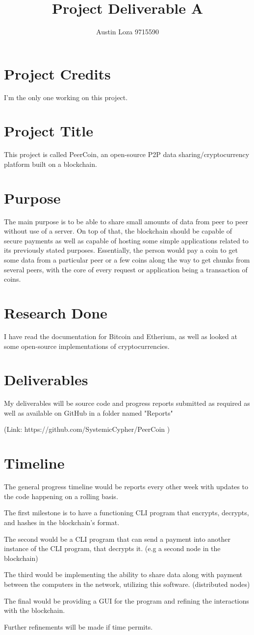 \documentclass [12pt] {article}
\begin{document}
\author{Austin Loza 9715590}
\title{Project Deliverable A}
\maketitle
\section*{Project Credits}
I'm the only one working on this project.
\section*{Project Title}
This project is called PeerCoin, an open-source P2P data sharing/cryptocurrency platform built on a blockchain. 
\section*{Purpose}
The main purpose is to be able to share small amounts of data from peer to peer without use of a server. On top of that, the blockchain should be capable of secure payments as well as capable of hosting some simple applications related to its previously stated purposes. Essentially, the person would pay a coin to get some data from a particular peer or a few coins along the way to get chunks from several peers, with the core of every request or application being a transaction of coins.
\section*{Research Done}
I have read the documentation for Bitcoin and Etherium, as well as looked at some open-source implementations of cryptocurrencies.
\section*{Deliverables}
My deliverables will be source code and progress reports submitted as required as well as available on GitHub in a folder named "Reports" 

(Link: https://github.com/SystemicCypher/PeerCoin )
\section*{Timeline}
The general progress timeline would be reports every other week with updates to the code happening on a rolling basis.

The first milestone is to have a functioning CLI program that encrypts, decrypts, and hashes in the blockchain's format.

The second would be a CLI program that can send a payment into another instance of the CLI program, that decrypts it. (e.g a second node in the blockchain)

The third would be implementing the ability to share data along with payment between the computers in the network, utilizing this software. (distributed nodes)

The final would be providing a GUI for the program and refining the interactions with the blockchain. 

Further refinements will be made if time permits.
\end{document}
